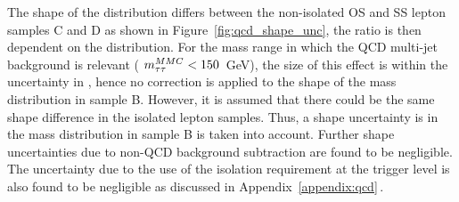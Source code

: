 


The shape of the \mmc distribution differs between the non-isolated  OS and SS lepton samples C and D as shown in Figure~\ref{fig:qcd_shape_unc},
the ratio \rqcd is then dependent on the \mmc distribution.
For the mass range in which the QCD multi-jet background is relevant ( $m_{\tau\tau}^{MMC}  < 150$~GeV),
the size of this effect is within the uncertainty in  \rqcd,  hence no correction is applied to the shape of the mass distribution
in sample B. However, it is assumed that there could be the same 
shape difference in the isolated lepton samples. Thus, a shape uncertainty is  in the mass distribution in 
sample B is taken into account. Further 
shape uncertainties due to non-QCD background subtraction are found to be negligible. The uncertainty due to the use of the isolation 
requirement at the trigger level is also found to be negligible as discussed in Appendix~\ref{appendix:qcd}\,.






